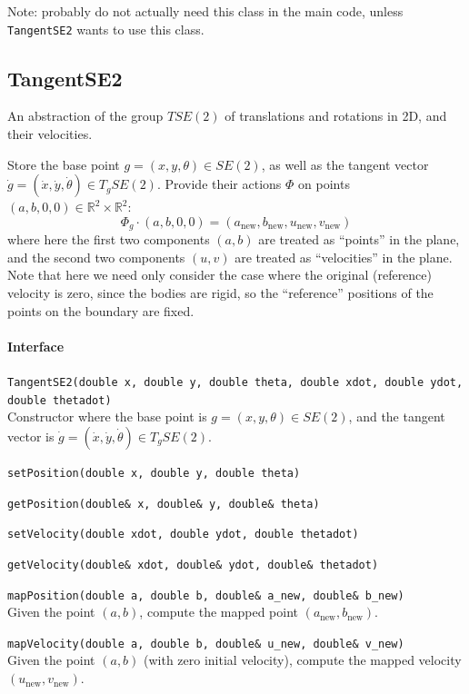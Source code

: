 \documentclass[11pt]{article}
\let\code\lstinline
\begin{document}
Note: probably do not actually need this class in the main code, unless \code|TangentSE2| wants to use this class.

\subsection{TangentSE2}
An abstraction of the group $TSE(2)$ of translations and rotations in 2D, and their velocities.

Store the base point $g=(x,y,\theta)\in SE(2)$, as well as the tangent vector $\dot g=(\dot x, \dot y, \dot\theta)\in T_g SE(2)$.  Provide their actions $\Phi$ on points $(a,b,0,0)\in\mathbb{R}^2\times\mathbb{R}^2$:
\[\Phi_g \cdot (a,b,0,0) = (a_\text{new},b_\text{new},u_\text{new},v_\text{new})\]
where here the first two components $(a,b)$ are treated as ``points'' in the plane, and the second two components $(u,v)$ are treated as ``velocities'' in the plane.  Note that here we need only consider the case where the original (reference) velocity is zero, since the bodies are rigid, so the ``reference'' positions of the points on the boundary are fixed.

\paragraph{Interface}
\begin{description}
	\item \code|TangentSE2(double x, double y, double theta, double xdot, double ydot, double thetadot)|\\
		Constructor where the base point is $g=(x,y,\theta)\in SE(2)$, and the tangent vector is $\dot g=(\dot x, \dot y, \dot\theta)\in T_g SE(2)$.
	\item \code|setPosition(double x, double y, double theta)|
	\item \code|getPosition(double& x, double& y, double& theta)|
	\item \code|setVelocity(double xdot, double ydot, double thetadot)|
	\item \code|getVelocity(double& xdot, double& ydot, double& thetadot)|
	\item \code|mapPosition(double a, double b, double& a_new, double& b_new)|\\
		Given the point $(a,b)$, compute the mapped point $(a_\text{new},b_\text{new})$.
	\item \code|mapVelocity(double a, double b, double& u_new, double& v_new)|\\
		Given the point $(a,b)$ (with zero initial velocity), compute the mapped velocity $(u_\text{new},v_\text{new})$.
 \end{description}






% 
% 
\end{document}
